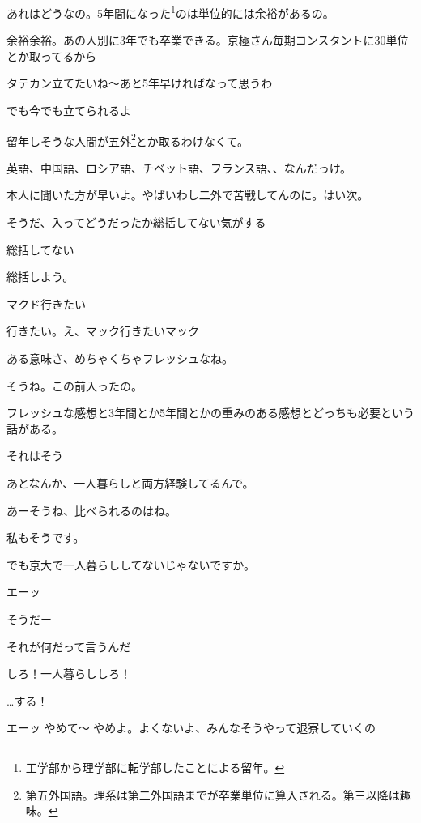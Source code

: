 \begin{multicols}{3}
あれはどうなの。5年間になった\footnote{工学部から理学部に転学部したことによる留年。}のは単位的には余裕があるの。

余裕余裕。あの人別に3年でも卒業できる。京極さん毎期コンスタントに30単位とか取ってるから

タテカン立てたいね～あと5年早ければなって思うわ

でも今でも立てられるよ

留年しそうな人間が五外\footnote{第五外国語。理系は第二外国語までが卒業単位に算入される。第三以降は趣味。}とか取るわけなくて。

英語、中国語、ロシア語、チベット語、フランス語、、なんだっけ。

本人に聞いた方が早いよ。やばいわし二外で苦戦してんのに。はい次。

\vspace{5mm}


\noindent{}

そうだ、入ってどうだったか総括してない気がする

総括してない

総括しよう。

マクド行きたい

行きたい。え、マック行きたいマック

ある意味さ、めちゃくちゃフレッシュなね。

そうね。この前入ったの。

フレッシュな感想と3年間とか5年間とかの重みのある感想とどっちも必要という話がある。

それはそう

あとなんか、一人暮らしと両方経験してるんで。

あーそうね、比べられるのはね。

私もそうです。

でも京大で一人暮らししてないじゃないですか。

エーッ

そうだー

それが何だって言うんだ

しろ！一人暮らししろ！

…する！

エーッ やめて～ やめよ。よくないよ、みんなそうやって退寮していくの


\end{multicols}
